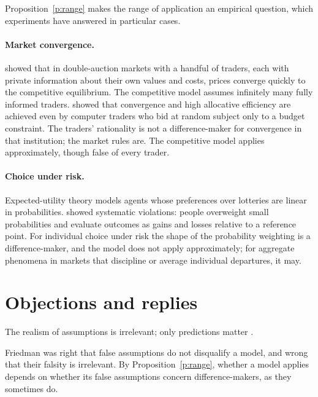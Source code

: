 \documentclass{situationist-preprint}
\begin{document}
Proposition~\ref{p:range} makes the range of application an empirical question, which experiments have answered in particular cases.

\paragraph{Market convergence.} \citet{Smith1962} showed that in double-auction markets with a handful of traders, each with private information about their own values and costs, prices converge quickly to the competitive equilibrium. The competitive model assumes infinitely many fully informed traders. \citet{GodeSunder1993} showed that convergence and high allocative efficiency are achieved even by computer traders who bid at random subject only to a budget constraint. The traders' rationality is not a difference-maker for convergence in that institution; the market rules are. The competitive model applies approximately, though false of every trader.

\paragraph{Choice under risk.} Expected-utility theory models agents whose preferences over lotteries are linear in probabilities. \citet{KahnemanTversky1979} showed systematic violations: people overweight small probabilities and evaluate outcomes as gains and losses relative to a reference point. For individual choice under risk the shape of the probability weighting is a difference-maker, and the model does not apply approximately; for aggregate phenomena in markets that discipline or average individual departures, it may.

\section{Objections and replies}

\begin{objection}[Friedman]
The realism of assumptions is irrelevant; only predictions matter \citep{Friedman1953}.
\end{objection}

\begin{reply}
Friedman was right that false assumptions do not disqualify a model, and wrong that their falsity is irrelevant. By Proposition~\ref{p:range}, whether a model applies depends on whether its false assumptions concern difference-makers, as they sometimes do.
\end{reply}
\end{document}
